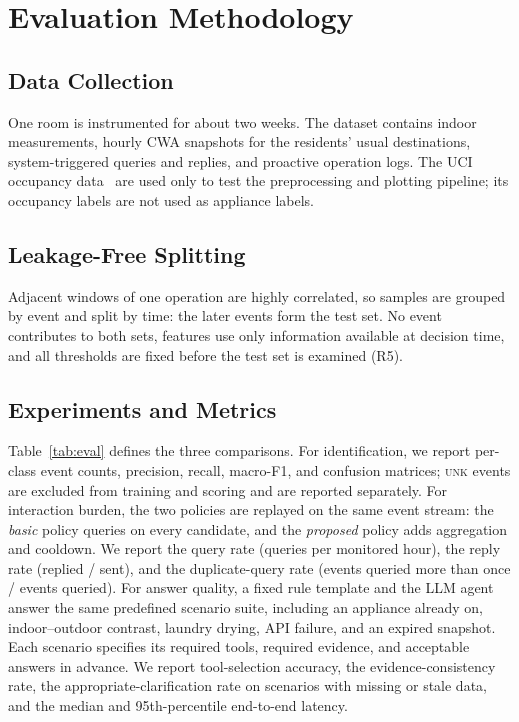 \documentclass[conference]{IEEEtran}
\begin{document}
\section{Evaluation Methodology}
\subsection{Data Collection}
One room is instrumented for about two weeks. The dataset contains indoor measurements, hourly CWA snapshots for the residents' usual destinations, system-triggered queries and replies, and proactive operation logs. The UCI occupancy data~\cite{candanedo2016occupancy} are used only to test the preprocessing and plotting pipeline; its occupancy labels are not used as appliance labels.

\subsection{Leakage-Free Splitting}
Adjacent windows of one operation are highly correlated, so samples are grouped by event and split by time: the later events form the test set. No event contributes to both sets, features use only information available at decision time, and all thresholds are fixed before the test set is examined (R5).

\subsection{Experiments and Metrics}
Table~\ref{tab:eval} defines the three comparisons. For identification, we report per-class event counts, precision, recall, macro-F1, and confusion matrices; \textsc{unk} events are excluded from training and scoring and are reported separately. For interaction burden, the two policies are replayed on the same event stream: the \emph{basic} policy queries on every candidate, and the \emph{proposed} policy adds aggregation and cooldown. We report the query rate (queries per monitored hour), the reply rate (replied / sent), and the duplicate-query rate (events queried more than once / events queried). For answer quality, a fixed rule template and the LLM agent answer the same predefined scenario suite, including an appliance already on, indoor--outdoor contrast, laundry drying, API failure, and an expired snapshot. Each scenario specifies its required tools, required evidence, and acceptable answers in advance. We report tool-selection accuracy, the evidence-consistency rate, the appropriate-clarification rate on scenarios with missing or stale data, and the median and 95th-percentile end-to-end latency.
\end{document}
